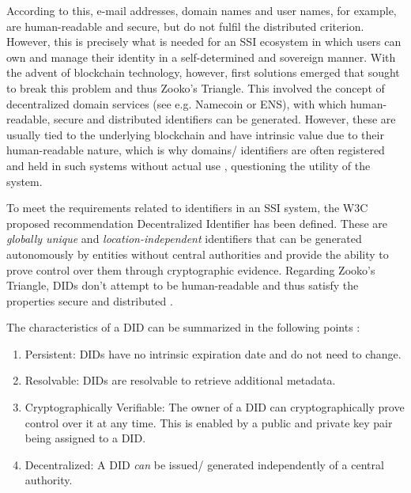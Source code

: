         According to this, e-mail addresses, domain names and user names, for example, are human-readable and secure, but do not fulfil the distributed criterion. However, this is precisely what is needed for an \ac{SSI} ecosystem in which users can own and manage their identity in a self-determined and sovereign manner. With the advent of blockchain technology, however, first solutions emerged that sought to break this problem and thus Zooko's Triangle. This involved the concept of decentralized domain services (see e.g. Namecoin or ENS), with which human-readable, secure and distributed identifiers can be generated. However, these are usually tied to the underlying blockchain and have intrinsic value due to their human-readable nature, which is why domains/ identifiers are often registered and held in such systems without actual use \cite{kalodner_empirical_2015}, questioning the utility of the system.
        
        To meet the requirements related to identifiers in an \ac{SSI} system, the W3C proposed recommendation Decentralized Identifier has been defined. These are \textit{globally unique} and \textit{location-independent} identifiers that can be generated autonomously by entities without central authorities and provide the ability to prove control over them through cryptographic evidence. Regarding Zooko's Triangle, \acp{DID} don't attempt to be human-readable and thus satisfy the properties secure and distributed \cite[p. 185]{preukschat_self-sovereign_2021}. \cite{sporny_decentralized_2021}
        
        The characteristics of a \ac{DID} can be summarized in the following points \cite[p. 160]{preukschat_self-sovereign_2021}: 
        
        \begin{enumerate}
        	\item Persistent: \acp{DID} have no intrinsic expiration date and do not need to change.
        	\item Resolvable: \acp{DID} are resolvable to retrieve additional metadata.
        	\item Cryptographically Verifiable: The owner of a \ac{DID} can cryptographically prove control over it at any time. This is enabled by a public and private key pair being assigned to a \ac{DID}.
        	\item Decentralized: A \ac{DID} \textit{can} be issued/ generated independently of a central authority.
        \end{enumerate}
        
